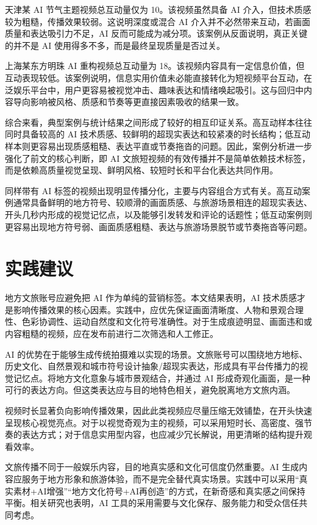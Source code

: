 天津某 AI 节气主题视频总互动量仅为 10。该视频虽然具备 AI 介入，但技术质感较为粗糙，传播效果较弱。这说明深度或混合 AI 介入并不必然带来互动，若画面质量和表达吸引力不足，AI 反而可能成为减分项。该案例从反面说明，真正关键的并不是 AI 使用得多不多，而是最终呈现质量是否过关。

上海某东方明珠 AI 重构视频总互动量为 18。该视频内容具有一定信息价值，但互动表现较低。该案例说明，信息实用价值未必能直接转化为短视频平台互动，在泛娱乐平台中，用户更容易被视觉冲击、趣味表达和情绪唤起吸引。这与回归中内容导向影响被风格、质感和节奏等更直接因素吸收的结果一致。

综合来看，典型案例与统计结果之间形成了较好的相互印证关系。高互动样本往往同时具备较高的 AI 技术质感、较鲜明的超现实表达和较紧凑的时长结构；低互动样本则更容易出现质感粗糙、表达平直或节奏拖沓的问题。因此，案例分析进一步强化了前文的核心判断，即 AI 文旅短视频的有效传播并不是简单依赖技术标签，而是依赖高质量视觉呈现、鲜明风格、较短时长和平台化表达共同作用。

同样带有 AI 标签的视频出现明显传播分化，主要与内容组合方式有关。高互动案例通常具备鲜明的地方符号、较顺滑的画面质感、与旅游场景相连的超现实表达、开头几秒内形成的视觉记忆点，以及能够引发转发和评论的话题性；低互动案例则更容易出现地方符号弱、画面质感粗糙、表达与旅游场景脱节或节奏拖沓等问题。

\section{实践建议}

地方文旅账号应避免把 AI 作为单纯的营销标签。本文结果表明，AI 技术质感才是影响传播效果的核心因素。实践中，应优先保证画面清晰度、人物和景观合理性、色彩协调性、运动自然度和文化符号准确性。对于生成痕迹明显、画面违和或内容粗糙的视频，应在发布前进行二次筛选和人工修正。

AI 的优势在于能够生成传统拍摄难以实现的场景。文旅账号可以围绕地方地标、历史文化、自然景观和城市符号设计抽象/超现实表达，形成具有平台传播力的视觉记忆点。将地方文化意象与城市景观结合，并通过 AI 形成奇观化画面，是一种可行的表达方向。但这类表达应与目的地特色相关，避免脱离地方文旅内涵。

视频时长显著负向影响传播效果，因此此类视频应尽量压缩无效铺垫，在开头快速呈现核心视觉亮点。对于以视觉奇观为主的视频，可以采用短时长、高密度、强节奏的表达方式；对于信息实用型内容，也应减少冗长解说，用更清晰的结构提升观看效率。

文旅传播不同于一般娱乐内容，目的地真实感和文化可信度仍然重要。AI 生成内容应服务于地方形象和旅游体验，而不是完全替代真实场景。实践中可以采用“真实素材+AI增强”“地方文化符号+AI再创造”的方式，在新奇感和真实感之间保持平衡。相关研究也表明，AI 工具的采用需要与文化保存、服务能力和受众信任共同考虑\cite{lit25}。


